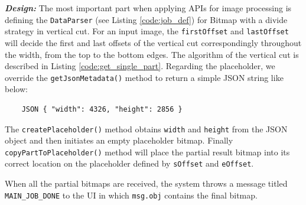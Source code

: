 \documentclass{sig-alternate}[10pt]
\begin{document}
\textbf{\emph{Design:}}
The most important part when applying APIs for image processing is defining the \texttt{DataParser} (see Listing \ref{code:job_def}) for Bitmap with a divide strategy in vertical cut. For an input image, the \texttt{firstOffset} and \texttt{lastOffset} will decide the first and last offsets of the vertical cut correspondingly throughout the width, from the top to the bottom edges. The algorithm of the vertical cut is described in Listing \ref{code:get_single_part}. Regarding the placeholder, we override the \texttt{getJsonMetadata()} method to return a simple JSON string like below:

	\begin{lstlisting} 
	JSON { "width": 4326, "height": 2856 } 
	\end{lstlisting}

The \texttt{createPlaceholder()} method obtains \texttt{width} and \texttt{height} from the JSON object and then initiates an empty placeholder bitmap. Finally \texttt{copyPartToPlaceholder()} method will place the partial result bitmap into its correct location on the placeholder defined by \texttt{sOffset} and \texttt{eOffset}.\\

\begin{figure}
\noindent {}
\end{figure}

When all the partial bitmaps are received, the system throws a message titled \texttt{MAIN\_JOB\_DONE} to the UI in which \texttt{msg.obj} contains the final bitmap.
\end{document}
